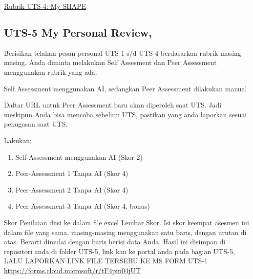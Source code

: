 \documentclass[
  letterpaper,
  DIV=11,
  numbers=noendperiod]{scrreprt}
\providecommand{\tightlist}{%
  \setlength{\itemsep}{0pt}\setlength{\parskip}{0pt}}
\begin{document}
\href{./asesmen/Rubrik_II-2100_CSV/UTS-4.csv}{Rubrik UTS-4: My SHAPE}

\subsection*{UTS-5 My Personal Review,}\label{uts-5-my-personal-review}

Berisikan telahan pesan personal UTS-1 s/d UTS-4 berdasarkan rubrik
masing-masing. Anda diminta melakukan Self Assesment dan Peer Assessment
menggunakan rubrik yang ada.

Self Assessment menggunakan AI, sedangkan Peer Assessment dilakukan
manual

\begin{tcolorbox}[enhanced jigsaw, opacitybacktitle=0.6, titlerule=0mm, colbacktitle=quarto-callout-warning-color!10!white, rightrule=.15mm, colframe=quarto-callout-warning-color-frame, breakable, arc=.35mm, leftrule=.75mm, bottomtitle=1mm, opacityback=0, toptitle=1mm, title=\textcolor{quarto-callout-warning-color}{\faExclamationTriangle}\hspace{0.5em}{Penugasan Peer Assignmen Baru Ada Nanti Saat UTS}, bottomrule=.15mm, coltitle=black, left=2mm, toprule=.15mm, colback=white]

Daftar URL untuk Peer Assessment baru akan diperoleh saat UTS. Jadi
meskipun Anda bisa mencoba sebelum UTS, pastikan yang anda laporkan
sesuai penugasan saat UTS.

\end{tcolorbox}

Lakukan:

\begin{enumerate}
\def\labelenumi{\arabic{enumi}.}
\tightlist
\item
  Self-Assessment menggunakan AI (Skor 2)
\item
  Peer-Assessment 1 Tanpa AI (Skor 4)
\item
  Peer-Assessment 2 Tanpa AI (Skor 4)
\item
  Peer-Assessment 3 Tanpa AI (Skor 4, bonus)
\end{enumerate}

Skor Penilaian diisi ke dalam file excel
\href{./asesmen/UTS-5_Skor.xlsx}{Lembar Skor}. Isi skor keempat asesmen
ini dalam file yang sama, masing-masing menggunakan satu baris, dengan
urutan di atas. Berarti dimulai dengan baris berisi data Anda. Hasil ini
disimpan di repositori anda di folder UTS-5, link kan ke portal anda
pada bagian UTS-5, LALU LAPORKAN LINK FILE TERSEBU KE MS FORM UTS-1
\url{https://forms.cloud.microsoft/r/tF4pm04jUT}
\end{document}
